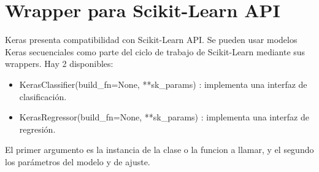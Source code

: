 \section{Wrapper para Scikit-Learn API}
Keras presenta compatibilidad con Scikit-Learn API. Se pueden usar modelos Keras secuenciales como parte del ciclo de trabajo de Scikit-Learn mediante sus wrappers. Hay 2 disponibles:
\begin{itemize}[noitemsep]
\item KerasClassifier(build\_fn=None, **sk\_params) : implementa una interfaz de clasificación.
\item KerasRegressor(build\_fn=None, **sk\_params) : implementa una interfaz de regresión.
\end{itemize}
El primer argumento es la instancia de la clase o la funcion a llamar, y el segundo los parámetros del modelo y de ajuste.